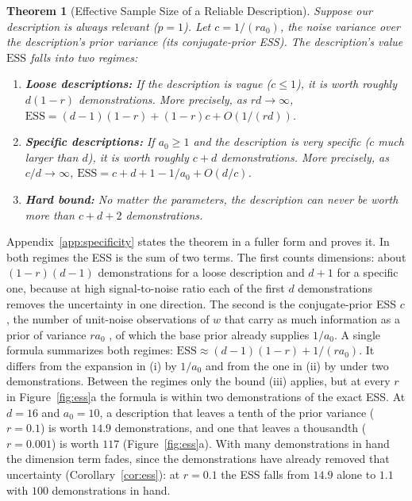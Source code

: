 \documentclass{article}
\newtheorem{theorem}{Theorem}
\newcommand{\ess}{\mathrm{ESS}}
\begin{document}
\begin{theorem}[Effective Sample Size of a Reliable Description]\label{prop:reliable}
Suppose our description is always relevant ($p = 1$). Let $c = 1 / (r a_0)$, the noise variance over the description's prior variance (its conjugate-prior ESS). The description's value $\ess$ falls into two regimes:
\begin{enumerate}
    \item[(i)] \textbf{Loose descriptions:} If the description is vague ($c \le 1$), it is worth roughly $d(1-r)$ demonstrations. More precisely, as $rd \to \infty$, $\ess = (d-1)(1-r) + (1-r)c + O(1/(rd))$.
    \item[(ii)] \textbf{Specific descriptions:} If $a_0 \ge 1$ and the description is very specific ($c$ much larger than $d$), it is worth roughly $c + d$ demonstrations. More precisely, as $c/d \to \infty$, $\ess = c + d + 1 - 1/a_0 + O(d/c)$.
    \item[(iii)] \textbf{Hard bound:} No matter the parameters, the description can never be worth more than $c + d + 2$ demonstrations.
\end{enumerate}
\end{theorem}
Appendix~\ref{app:specificity} states the theorem in a fuller form and proves it. In both regimes the ESS is the sum of two terms. The first counts dimensions: about $(1-r)(d-1)$ demonstrations for a loose description and $d+1$ for a specific one, because at high signal-to-noise ratio each of the first $d$ demonstrations removes the uncertainty in one direction. The second is the conjugate-prior ESS $c$, the number of unit-noise observations of $w$ that carry as much information as a prior of variance $r a_0$ \citep{neuenschwander2020}, of which the base prior already supplies $1/a_0$. A single formula summarizes both regimes: $\ess \approx (d-1)(1-r) + 1/(ra_0)$. It differs from the expansion in (i) by $1/a_0$ and from the one in (ii) by under two demonstrations. Between the regimes only the bound (iii) applies, but at every $r$ in Figure~\ref{fig:ess}a the formula is within two demonstrations of the exact ESS. At $d = 16$ and $a_0 = 10$, a description that leaves a tenth of the prior variance ($r = 0.1$) is worth $14.9$ demonstrations, and one that leaves a thousandth ($r = 0.001$) is worth $117$ (Figure~\ref{fig:ess}a). With many demonstrations in hand the dimension term fades, since the demonstrations have already removed that uncertainty (Corollary~\ref{cor:ess}): at $r = 0.1$ the ESS falls from $14.9$ alone to $1.1$ with $100$ demonstrations in hand.
\end{document}
